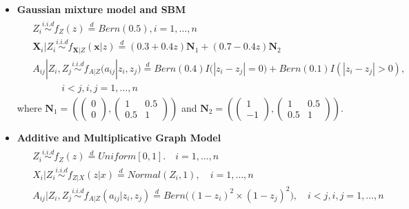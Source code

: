 \documentclass[12pt]{article}
\theoremstyle{definition}
\begin{document}
\begin{itemize}
	\item \textbf{Gaussian mixture model and SBM}
	\begin{equation}
		\label{eq:gaus}
		\begin{gathered}
		\begin{split}
		&Z_{i} \overset{i.i.d}{\sim}  f_{Z}(z) \stackrel{d}{=} Bern(0.5), i = 1, \ldots, n \\ 
		& \mathbf{X}_{i} | Z_{i} \overset{i.i.d}{\sim} f_{\mathbf{X}|Z}(\mathbf{x}|z) \stackrel{d}{=} (0.3+0.4z) \mathbf{N}_{1} + (0.7 - 0.4z) \mathbf{N}_{2} \\
		& A_{ij} | Z_{i}, Z_{j} \overset{i.i.d}{\sim} f_{A|Z} (a_{ij} | z_{i}, z_{j}) \stackrel{d}{=} Bern(0.4) I\big( |z_{i} - z_{j}| = 0 \big) + Bern(0.1 ) I(|z_{i} - z_{j}| > 0), \\
		& \quad \quad \quad  i < j, i,j =1,\ldots, n
		\end{split}
		\end{gathered}
	\end{equation}
	where $\mathbf{N}_{1} = \left(  \begin{pmatrix}  0 \\ 0 \end{pmatrix}, \begin{pmatrix} 1 & 0.5 \\ 0.5 & 1 \end{pmatrix}    \right)$ and $\mathbf{N}_{2} = \left(  \begin{pmatrix}  1 \\ -1 \end{pmatrix}, \begin{pmatrix} 1 & 0.5 \\ 0.5 & 1 \end{pmatrix}    \right)$.
	
	\item \textbf{Additive and Multiplicative Graph Model}
	\begin{equation}
		\label{eq:ame}
		\begin{gathered}
		\begin{aligned}
		&	Z_{i} \overset{i.i.d}{\sim} f_{Z}(z) \stackrel{d}{=} Uniform[0,1]. \quad i = 1, \ldots, n \\ 
		&	X_{i} | Z_{i} \overset{i.i.d}{\sim}  f_{Z|X}(z|x) \stackrel{d}{=}  Normal(Z_{i}, 1), \quad i= 1, \ldots, n \\
		&	A_{ij} | Z_{i}, Z_{j} \overset{i.i.d}{\sim}  f_{A|Z}(a_{ij} | z_{i}, z_{j}) \stackrel{d}{=}   Bern \big(  ( 1 - z_{i})^2 \times (1 - z_{j})^2    \big), \quad i < j, i,j = 1, \ldots, n
		\end{aligned}
		\end{gathered}
	\end{equation}
	

\end{itemize}
\end{document}

